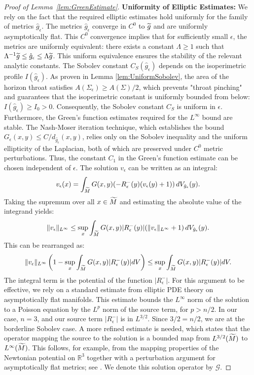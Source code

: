 \begin{proof}[Proof of Lemma~\ref{lem:GreenEstimate}]
\textbf{Uniformity of Elliptic Estimates:} We rely on the fact that the required elliptic estimates hold uniformly for the family of metrics $\hat{g}_\epsilon$. The metrics $\hat{g}_\epsilon$ converge in $C^0$ to $\widetilde{g}$ and are uniformly asymptotically flat. This $C^0$ convergence implies that for sufficiently small $\epsilon$, the metrics are uniformly equivalent: there exists a constant $\Lambda \ge 1$ such that $\Lambda^{-1} \widetilde{g} \le \hat{g}_\epsilon \le \Lambda \widetilde{g}$.
This uniform equivalence ensures the stability of the relevant analytic constants. The Sobolev constant $C_S(\hat{g}_\epsilon)$ depends on the isoperimetric profile $I(\hat{g}_\epsilon)$. As proven in Lemma \ref{lem:UniformSobolev}, the area of the horizon throat satisfies $A(\Sigma_\epsilon) \ge A(\Sigma)/2$, which prevents "throat pinching" and guarantees that the isoperimetric constant is uniformly bounded from below: $I(\hat{g}_\epsilon) \ge I_0 > 0$. Consequently, the Sobolev constant $C_S$ is uniform in $\epsilon$.
Furthermore, the Green's function estimates required for the $L^\infty$ bound are stable. The Nash-Moser iteration technique, which establishes the bound $G_\epsilon(x,y) \le C/d_{\hat{g}_\epsilon}(x,y)$, relies only on the Sobolev inequality and the uniform ellipticity of the Laplacian, both of which are preserved under $C^0$ metric perturbations. Thus, the constant $C_1$ in the Green's function estimate can be chosen independent of $\epsilon$.
The solution $v_\epsilon$ can be written as an integral:
\[ v_\epsilon(x) = \int_{\widetilde{M}} G(x,y) (-R^-_\epsilon(y) (v_\epsilon(y)+1)) \, dV_{\hat{g}_\epsilon}(y). \]
Taking the supremum over all $x \in \widetilde{M}$ and estimating the absolute value of the integrand yields:
\[ \|v_\epsilon\|_{L^\infty} \le \sup_x \int_{\widetilde{M}} G(x,y) |R^-_\epsilon(y)| (\|v_\epsilon\|_{L^\infty}+1) \, dV_{\hat{g}_\epsilon}(y). \]
This can be rearranged as:
\[ \|v_\epsilon\|_{L^\infty} \left( 1 - \sup_x \int_{\widetilde{M}} G(x,y) |R^-_\epsilon(y)| dV \right) \le \sup_x \int_{\widetilde{M}} G(x,y) |R^-_\epsilon(y)| dV. \]
The integral term is the potential of the function $|R^-_\epsilon|$. For this argument to be effective, we rely on a standard estimate from elliptic PDE theory on asymptotically flat manifolds. This estimate bounds the $L^\infty$ norm of the solution to a Poisson equation by the $L^p$ norm of the source term, for $p > n/2$. In our case, $n=3$, and our source term $|R^-_\epsilon|$ is in $L^{3/2}$. Since $3/2 = n/2$, we are at the borderline Sobolev case. A more refined estimate is needed, which states that the operator mapping the source to the solution is a bounded map from $L^{3/2}(\widetilde{M})$ to $L^\infty(\widetilde{M})$. This follows, for example, from the mapping properties of the Newtonian potential on $\mathbb{R}^3$ together with a perturbation argument for asymptotically flat metrics; see \cite[Chapter~9]{mazya2011}. We denote this solution operator by $\mathcal{G}$.

\end{proof}
